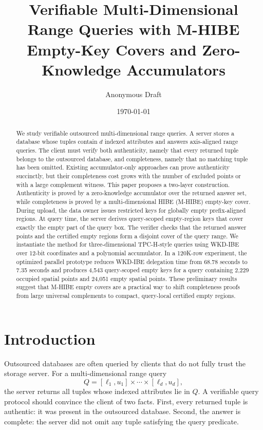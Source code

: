 \documentclass[11pt]{article}
\title{Verifiable Multi-Dimensional Range Queries with M-HIBE Empty-Key Covers and Zero-Knowledge Accumulators}
\author{Anonymous Draft}
\date{\today}
\begin{document}
\maketitle

\begin{abstract}
We study verifiable outsourced multi-dimensional range queries. A server stores a database whose tuples contain $d$ indexed attributes and answers axis-aligned range queries. The client must verify both authenticity, namely that every returned tuple belongs to the outsourced database, and completeness, namely that no matching tuple has been omitted. Existing accumulator-only approaches can prove authenticity succinctly, but their completeness cost grows with the number of excluded points or with a large complement witness. This paper proposes a two-layer construction. Authenticity is proved by a zero-knowledge accumulator over the returned answer set, while completeness is proved by a multi-dimensional HIBE (M-HIBE) empty-key cover. During upload, the data owner issues restricted keys for globally empty prefix-aligned regions. At query time, the server derives query-scoped empty-region keys that cover exactly the empty part of the query box. The verifier checks that the returned answer points and the certified empty regions form a disjoint cover of the query range. We instantiate the method for three-dimensional TPC-H-style queries using WKD-IBE over 12-bit coordinates and a polynomial accumulator. In a 120K-row experiment, the optimized parallel prototype reduces WKD-IBE delegation time from 68.78 seconds to 7.35 seconds and produces 4,543 query-scoped empty keys for a query containing 2,229 occupied spatial points and 24,051 empty spatial points. These preliminary results suggest that M-HIBE empty covers are a practical way to shift completeness proofs from large universal complements to compact, query-local certified empty regions.
\end{abstract}

\section{Introduction}

Outsourced databases are often queried by clients that do not fully trust the storage server. For a multi-dimensional range query
\[
  Q = [\ell_1,u_1] \times \cdots \times [\ell_d,u_d],
\]
the server returns all tuples whose indexed attributes lie in $Q$. A verifiable query protocol should convince the client of two facts. First, every returned tuple is authentic: it was present in the outsourced database. Second, the answer is complete: the server did not omit any tuple satisfying the query predicate.
\end{document}
